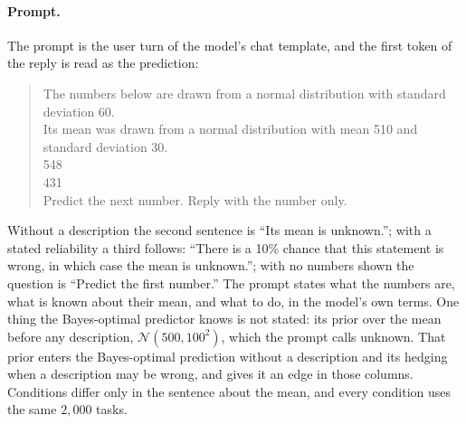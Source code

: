 \documentclass[10pt,twocolumn]{article}
\begin{document}
\paragraph{Prompt.} The prompt is the user turn of the model's chat template, and the first token of the reply is read as the prediction:

\begin{quote}\small\ttfamily
The numbers below are drawn from a normal distribution with standard deviation 60.\\
Its mean was drawn from a normal distribution with mean 510 and standard deviation 30.\\[3pt]
548\\
431\\[3pt]
Predict the next number. Reply with the number only.
\end{quote}

\noindent Without a description the second sentence is ``Its mean is unknown.''; with a stated reliability a third follows: ``There is a 10\% chance that this statement is wrong, in which case the mean is unknown.''; with no numbers shown the question is ``Predict the first number.'' The prompt states what the numbers are, what is known about their mean, and what to do, in the model's own terms. One thing the Bayes-optimal predictor knows is not stated: its prior over the mean before any description, $\mathcal{N}(500, 100^2)$, which the prompt calls unknown. That prior enters the Bayes-optimal prediction without a description and its hedging when a description may be wrong, and gives it an edge in those columns. Conditions differ only in the sentence about the mean, and every condition uses the same $2{,}000$ tasks.
\end{document}

